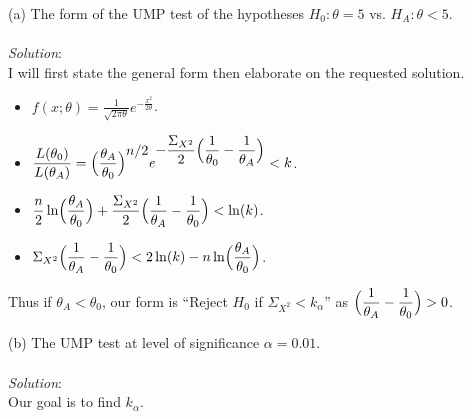 \documentclass[12pt]{article}
\newcommand{\XB}{\color{black}}
\newcommand{\XBB}{\color{blue}}
\newcommand{\ds}{\displaystyle}
\begin{document}
\XBB\hrulefill\XB 
\vspace{5mm} 

(a) The form of the UMP test of the hypotheses $ H_{0} : \theta = 5 $ vs. $ H_{A} : \theta < 5 $. \\
\vspace{2.5mm} \\
\textit{Solution}:
\vspace{2.5mm} \\ 

\noindent
I will first state the general form then elaborate on the requested solution. \\

\begin{itemize}
    \item $ \ds f(x; \theta) = \frac{1}{\sqrt{2\pi\theta}} e^{\ds -\frac{x^{2}}{2\theta}} $.
    \item $ \ds \frac{L(\theta_{0})}{L(\theta_{A})} = \Bigl( \frac{\theta_{A}}{\theta_{0}} \Bigr)^{\ds n/2} e^{\ds -\frac{\Sigma_{X^{2}}}{2}\Bigl( \frac{1}{\theta_{0}} - \frac{1}{\theta_{A}} \Bigr)} < k $.
    \item $ \ds \frac{n}{2}\ln\Bigl( \frac{\theta_{A}}{\theta_{0}} \Bigr) + \frac{\Sigma_{X^{2}}}{2}\Bigl( \frac{1}{\theta_{A}} - \frac{1}{\theta_{0}} \Bigr) < \ln(k) $.
    \item $ \ds \Sigma_{X^{2}}\Bigl( \frac{1}{\theta_{A}} - \frac{1}{\theta_{0}} \Bigr) < 2\ln(k) - n\ln\Bigl( \frac{\theta_{A}}{\theta_{0}} \Bigr) $.
\end{itemize}

\noindent
Thus if $ \theta_{A} < \theta_{0} $, our form is ``Reject $ H_{0} $ if $ \Sigma_{X^{2}} < k_{\alpha} $'' as $ \ds \Bigl( \frac{1}{\theta_{A}} - \frac{1}{\theta_{0}} \Bigr) > 0 $. \\

\vspace{2.5mm}

\newpage 

(b) The UMP test at level of significance $ \alpha = 0.01 $. \\
\vspace{2.5mm} \\
\textit{Solution}:
\vspace{2.5mm} \\

\noindent
Our goal is to find $ k_{\alpha} $. \\
\end{document}

